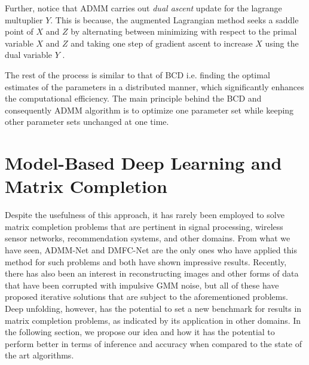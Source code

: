 Further, notice that ADMM carries out \textit{dual ascent} update for the lagrange multuplier $Y$. This is because, the augmented Lagrangian method seeks a saddle point of $X$ and $Z$ by alternating between minimizing with respect to the primal variable $X$ and $Z$ and taking one step of gradient ascent to increase $X$ using the dual variable $Y$ \cite{Wright-Ma-2022}. 

The rest of the process is similar to that of BCD i.e. finding the optimal estimates of the parameters in a distributed manner, which significantly enhances the computational efficiency. The main principle behind the BCD and consequently ADMM algorithm is to optimize one parameter set while keeping other parameter sets unchanged at one time.

\section{Model-Based Deep Learning and Matrix Completion}

Despite the usefulness of this approach, it has rarely been employed to solve matrix completion problems that are pertinent in signal processing, wireless sensor networks, recommendation systems, and other domains. From what we have seen, ADMM-Net \cite{admm-net} and DMFC-Net\cite{ma2022deep} are the only ones who have applied this method for such problems and both have shown impressive results. Recently, there has also been an interest in reconstructing images and other forms of data that have been corrupted with impulsive GMM noise, but all of these have proposed iterative solutions that are subject to the aforementioned problems. Deep unfolding, however, has the potential to set a new benchmark for results in matrix completion problems, as indicated by its application in other domains. In the following section, we propose our idea and how it has the potential to perform better in terms of inference and accuracy when compared to the state of the art algorithms.



